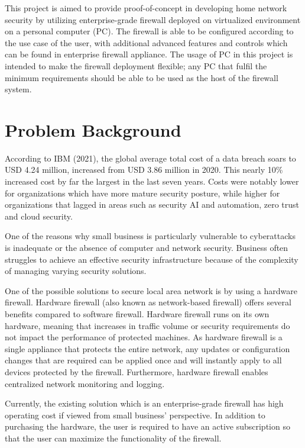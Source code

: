 \documentclass[../index.tex]{subfiles}
\begin{document}
This project is aimed to provide proof-of-concept in developing home network security by utilizing
enterprise-grade firewall deployed on virtualized environment on a personal computer (PC). The
firewall is able to be configured according to the use case of the user, with additional advanced
features and controls which can be found in enterprise firewall appliance. The usage of PC in this
project is intended to make the firewall deployment flexible; any PC that fulfil the minimum
requirements should be able to be used as the host of the firewall system.

\section{Problem Background}

According to IBM (2021), the global average total cost of a data breach soars to USD 4.24 million,
increased from USD 3.86 million in 2020. This nearly 10\% increased cost by far the largest in the
last seven years. Costs were notably lower for organizations which have more mature security
posture, while higher for organizations that lagged in areas such as security AI and automation,
zero trust and cloud security.

One of the reasons why small business is particularly vulnerable to cyberattacks is inadequate or
the absence of computer and network security. Business often struggles to achieve an effective
security infrastructure because of the complexity of managing varying security solutions.

One of the possible solutions to secure local area network is by using a hardware firewall. Hardware
firewall (also known as network-based firewall) offers several benefits compared to software
firewall. Hardware firewall runs on its own hardware, meaning that increases in traffic volume or
security requirements do not impact the performance of protected machines. As hardware firewall is a
single appliance that protects the entire network, any updates or configuration changes that are
required can be applied once and will instantly apply to all devices protected by the firewall.
Furthermore, hardware firewall enables centralized network monitoring and logging.

Currently, the existing solution which is an enterprise-grade firewall has high operating cost if
viewed from small business' perspective. In addition to purchasing the hardware, the user is
required to have an active subscription so that the user can maximize the functionality of the
firewall.
\end{document}
